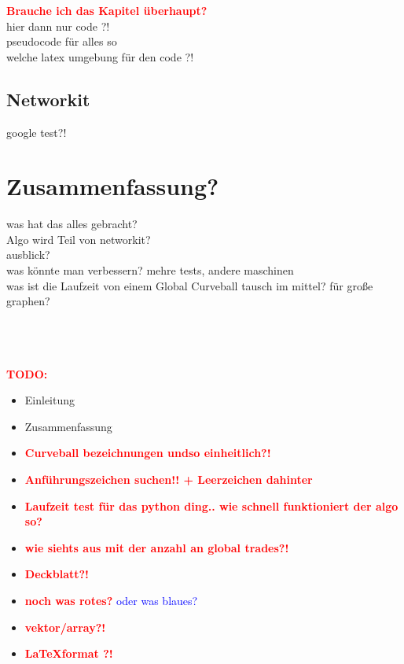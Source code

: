 \documentclass[a4paper]{scrreprt}
\theoremstyle{plain} %
\theoremstyle{definition} %
\newcommand{\gc}{Global Curveball}
\newcommand{\cb}{Curveball}
\newcommand{\red}[1]{\textcolor{red}{\textbf{#1}}}
\newcommand{\blue}[1]{\textcolor{blue}{#1}}
\begin{document}
\red{\huge Brauche ich das Kapitel überhaupt?}
\\
hier dann nur code ?! 
\\
pseudocode für alles so
\\
welche latex umgebung für den code ?!
\section{Networkit}
google test?!





\chapter{Zusammenfassung?}
was hat das alles gebracht? \\
Algo wird Teil von networkit?\\
ausblick?\\
was könnte man verbessern? mehre tests, andere maschinen
\\
was ist die Laufzeit von einem \gc{} tausch im mittel? für große graphen?

~\\
\\
\\

\red{\Huge TODO:}
\begin{itemize}
	\item Einleitung
	\item Zusammenfassung
	\item \red{\Large \cb{} bezeichnungen undso einheitlich?!}
	\item \red{\Large Anführungszeichen suchen!! + Leerzeichen dahinter}
	\item \red{\huge Laufzeit test für das python ding.. wie schnell funktioniert der algo so?}
	\item \red{wie siehts aus mit der anzahl an global trades?!}
	\item \red{\Large Deckblatt?!}
	\item \red{noch was rotes?} \blue{oder was blaues?}
	\item \red{vektor/array?!}
	\item \red{\LaTeX format ?!}
\end{itemize}
\end{document}
